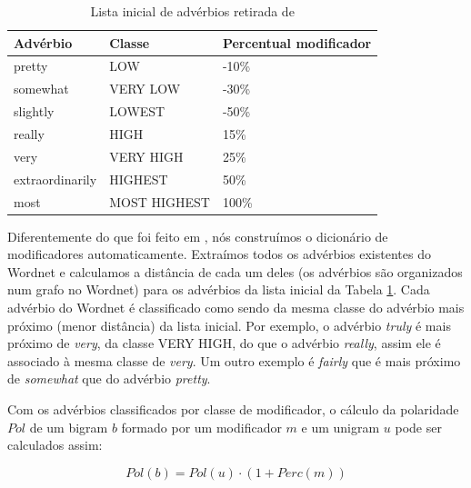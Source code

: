 \begin{table}[!h]
	\centering
    \begin{tabular}{lll}
    Advérbio         				& Classe          & Percentual modificador \\ \hline
    pretty                   			& LOW 			   & -10\% \\
    somewhat                   	& VERY LOW  & -30\% \\
    slightly                   		& LOWEST 	   & -50\% \\
    really                   			& HIGH 			   & 15\% \\
    very                   			& VERY HIGH &  25\% \\
    extraordinarily             & HIGHEST 	   & 50\% \\
    most                   			& MOST HIGHEST & 100\% \\
    \end{tabular}
    \caption{Lista inicial de advérbios retirada de \cite{taboada2011lexicon}}
	\label{table:adv_seed}
\end{table}

Diferentemente do que foi feito em , nós construímos o dicionário de modificadores automaticamente. Extraímos todos os advérbios existentes do Wordnet e calculamos a distância de cada um deles (os advérbios são organizados num grafo no Wordnet) para os advérbios da lista inicial da Tabela \ref{table:adv_seed}. Cada advérbio do Wordnet é classificado como sendo da mesma classe do advérbio mais próximo (menor distância) da lista inicial. Por exemplo, o advérbio \textit{truly} é mais próximo de \textit{very}, da classe VERY HIGH, do que o advérbio \textit{really}, assim ele é associado à mesma classe de \textit{very}. Um outro exemplo é \textit{fairly} que é mais próximo de \textit{somewhat} que do advérbio \textit{pretty}. 

Com os advérbios classificados por classe de modificador, o cálculo da polaridade $Pol$ de um bigram $b$ formado por um modificador $m$ e um unigram $u$ pode ser calculados assim: 

\begin{equation}
Pol(b) = Pol(u) \cdot (1 + Perc(m))
\label{eq:pol_bigrams}
\end{equation}


